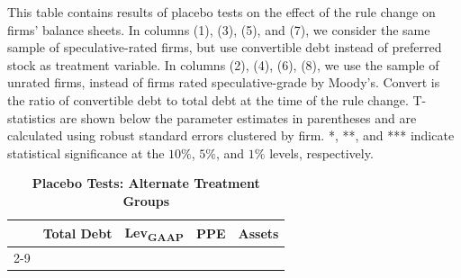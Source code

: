\documentclass[a4paper, 12pt]{article}
\begin{document}
\begin{landscape}
\pagestyle{empty}
    \begin{table}[htbp]
\caption{\textbf{Placebo Tests: Alternate Treatment Groups}} \label{table_combinedplacebo}
\begin{singlespace}
\begin{small}

\noindent This table contains results of placebo tests on the effect of the rule change on firms' balance sheets. In columns (1), (3), (5), and (7), we consider the same sample of speculative-rated firms, but use convertible debt instead of preferred stock as treatment variable. In columns (2), (4), (6), (8), we use the sample of unrated firms, instead of firms rated speculative-grade by Moody's. Convert is the ratio of convertible debt to total debt at the time of the rule change.  T-statistics are shown below the parameter estimates in parentheses and are calculated using robust standard errors clustered by firm. *, **, and *** indicate statistical significance at the $10\%$, $5\%$, and $1\%$ levels, respectively.

\end{small}
\end{singlespace}
\vspace{3mm}
\small
  \centering
    \begin{tabular}{lcccccccc}
    \toprule
    \textbf{ } &
      \multicolumn{2}{c}{\textbf{Total Debt}} &  \multicolumn{2}{c}{\textbf{Lev\textsubscript{GAAP}}} &
         \multicolumn{2}{c}{\textbf{PPE}} &  \multicolumn{2}{c}{\textbf{Assets}}
      \\
      \cline{2-9}

  

    \bottomrule
    \end{tabular}
\end{table}
\end{landscape}

\clearpage

\newpage
\end{document}
